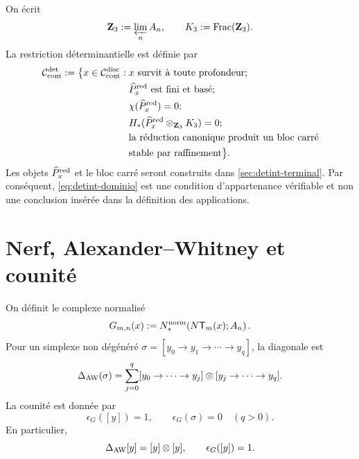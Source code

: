 On écrit
\begin{equation}\label{eq:detint-z3-k3}
 \mathbf Z_3:=\varprojlim_n A_n,
 \qquad
 K_3:=\operatorname{Frac}(\mathbf Z_3).
\end{equation}
La restriction déterminantielle est définie par
\begin{equation}\label{eq:detint-dominio}
\begin{split}
 \mathcal C_{\rm cont}^{\rm det}:=
 \bigl\{x\in\mathcal C_{\rm cont}^{\rm disc}:{}&
 x\text{ survit à toute profondeur};\\
 &\widehat P_x^{\rm red}\text{ est fini et basé};\\
 &\chi(\widehat P_x^{\rm red})=0;\\
 &H_*(\widehat P_x^{\rm red}\otimes_{\mathbf Z_3}K_3)=0;\\
 &\text{la réduction canonique produit un bloc carré}\\
 &\text{stable par raffinement}\bigr\}.
\end{split}
\end{equation}
Les objets \(\widehat P_x^{\rm red}\) et le bloc carré seront construits
dans \cref{sec:detint-terminal}. Par conséquent,
\eqref{eq:detint-dominio} est une condition d'appartenance vérifiable et non
une conclusion insérée dans la définition des applications.

\section{Nerf, Alexander--Whitney et counité}

On définit le complexe normalisé
\begin{equation}\label{eq:detint-gmn}
 G_{m,n}(x):=
 N_*^{\rm norm}\!\left(N\mathsf T_m(x);A_n\right).
\end{equation}
Pour un simplexe non dégénéré
\(\sigma=[y_0\to y_1\to\cdots\to y_q]\), la diagonale est
\begin{equation}\label{eq:detint-aw}
 \Delta_{\rm AW}(\sigma)
 =\sum_{j=0}^q
 [y_0\to\cdots\to y_j]\otimes
 [y_j\to\cdots\to y_q].
\end{equation}
La counité est donnée par
\begin{equation}\label{eq:detint-counidad-g}
 \epsilon_G([y])=1,
 \qquad
 \epsilon_G(\sigma)=0\quad(q>0).
\end{equation}
En particulier,
\begin{equation}\label{eq:detint-vertice-grouplike}
 \Delta_{\rm AW}[y]=[y]\otimes[y],
 \qquad
 \epsilon_G([y])=1.
\end{equation}

